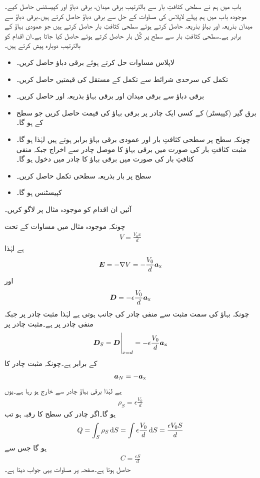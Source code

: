 باب  میں ہم نے سطحی کثافتِ بار سے بالترتیب برقی میدان، برقی دباؤ اور کپیسٹنس حاصل کیے۔موجودہ باب میں ہم پہلے لاپلاس کی مساوات کے حل سے برقی دباؤ حاصل کرتے ہیں۔برقی دباؤ سے میدان بذریعہ   اور بہاؤ بذریعہ  حاصل کرتے ہوئے سطحی کثافتِ بار حاصل کرتے ہیں جو عمودی بہاؤ کے برابر ہے۔سطحی کثافتِ بار سے سطح پر کُل بار حاصل کرتے ہوئے  حاصل کیا جاتا ہے۔ان اقدام کو بالترتیب دوبارہ پیش کرتے ہیں۔
\begin{itemize}
\item
لاپلاس مساوات حل کرتے ہوئے برقی دباؤ  حاصل کریں۔
\item
تکمل کی سرحدی شرائط سے تکمل کے مستقل کی قیمتیں حاصل کریں۔
\item
برقی دباؤ سے برقی میدان اور برقی بہاؤ  بذریعہ  اور  حاصل کریں۔
\item
برق گیر (کپیسٹر)  کے کسی ایک چادر پر برقی بہاؤ کی قیمت  حاصل کریں جو سطح کے   ہو گا۔ 
\item
چونکہ سطح پر سطحی کثافتِ بار اور عمودی برقی بہاؤ برابر ہوتے ہیں لہٰذا  ہو گا۔مثبت کثافتِ بار کی صورت میں برقی بہاؤ کا موصل چادر سے اخراج جبکہ منفی کثافتِ بار کی صورت میں برقی بہاؤ کا چادر میں دخول ہو گا۔
\item
سطح پر بار بذریعہ سطحی تکمل حاصل کریں۔
\item
کپیسٹنس  ہو گا۔
\end{itemize}
آئیں ان اقدام کو موجودہ مثال پر لاگو کریں۔

چونکہ موجودہ مثال میں مساوات  کے تحت
\begin{align*}
V=\frac{V_0x}{d}
\end{align*}
ہے لہٰذا
\begin{align*}
{\ensuremath{{\boldsymbol{E}}}}=-\nabla V=-\frac{V_0}{d}{\boldsymbol{a}}_{\textup{x}}
\end{align*}
اور
\begin{align*}
{\ensuremath{{\boldsymbol{D}}}}=-\epsilon \frac{V_0}{d}{\boldsymbol{a}}_{\textup{x}}
\end{align*}
چونکہ بہاؤ کی سمت مثبت سے منفی چادر کی جانب ہوتی ہے لہٰذا مثبت چادر  پر جبکہ منفی چادر  پر ہے۔مثبت چادر پر
\begin{align*}
\kvec{D}_S=\eval{\kvec{D}}_{x=d}=-\epsilon \frac{V_0}{d}\ax
\end{align*}
کے برابر ہے۔چونکہ مثبت چادر کا
\begin{align*}
{\boldsymbol{a}}_N=-{\boldsymbol{a}}_{\textup{x}}
\end{align*}
ہے لہٰذا برقی بہاؤ چادر سے خارج ہو رہا ہے۔یوں
\begin{align*}
\rho_S=\epsilon \frac{V_0}{d}
\end{align*}
ہو گا۔اگر چادر کی سطح کا رقبہ  ہو تب
\begin{align*}
Q=\int_S \rho_S \dif S=\int \epsilon \frac{V_0}{d} \dif S=\frac{\epsilon V_0 S}{d}
\end{align*}
ہو گا جس سے
\begin{align*}
C=\frac{\epsilon S}{d}
\end{align*}
حاصل ہوتا ہے۔صفحہ  پر مساوات  یہی جواب دیتا ہے۔

